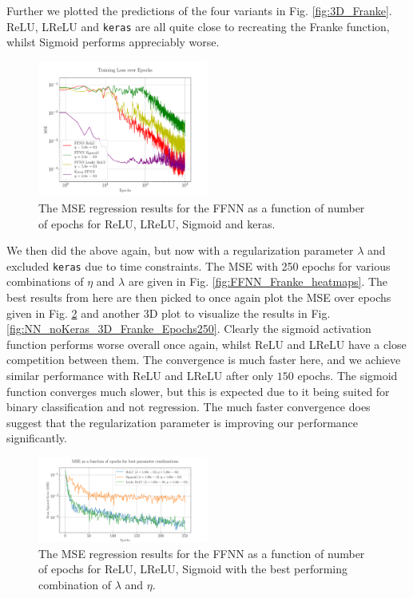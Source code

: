 \documentclass[%
reprint,s
amsmath,amssymb,
aps,
]{revtex4-2}
\begin{document}
Further we plotted the predictions of the four variants in Fig. \ref{fig:3D_Franke}. ReLU, LReLU and \texttt{keras} are all quite close to recreating the Franke function, whilst Sigmoid performs appreciably worse.
\begin{figure}[ht!]
	\includegraphics[width=0.5\textwidth]{Figures/NN_MSE_Franke_Epoch.pdf}
	\caption{The MSE regression results for the FFNN as a function of number of epochs for ReLU, LReLU, Sigmoid and keras.}
	\label{fig:NN_Franke_Epochs}
\end{figure}

We then did the above again, but now with a regularization parameter $\lambda$ and excluded \texttt{keras} due to time constraints. The MSE with 250 epochs for various combinations of $\eta$ and $\lambda$ are given in Fig. \ref{fig:FFNN_Franke_heatmaps}. The best results from here are then picked to once again plot the MSE over epochs given in Fig. \ref{fig:best_MSE_Franke_Epochs} and another 3D plot to visualize the results in Fig. \ref{fig:NN_noKeras_3D_Franke_Epochs250}. Clearly the sigmoid activation function performs worse overall once again, whilst ReLU and LReLU have a close competition between them. The convergence is much faster here, and we achieve similar performance with ReLU and LReLU after only $150$ epochs. The sigmoid function converges much slower, but this is expected due to it being suited for binary classification and not regression. The much faster convergence does suggest that the regularization parameter is improving our performance significantly.
\begin{figure}[ht!]
	\includegraphics[width=0.5\textwidth]{Figures/Best_MSE_vs_Epochs250.pdf}
	\caption{The MSE regression results for the FFNN as a function of number of epochs for ReLU, LReLU, Sigmoid with the best performing combination of $\lambda$ and $\eta$.}
	\label{fig:best_MSE_Franke_Epochs}
\end{figure}
\end{document}

